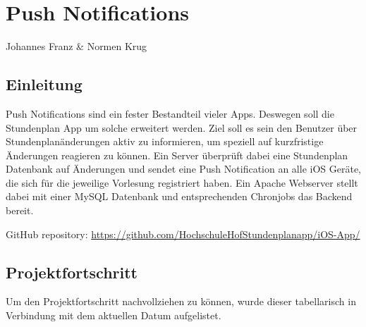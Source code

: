 \chapter{Push Notifications}
Johannes Franz \& Normen Krug

\section{Einleitung}
Push Notifications sind ein fester Bestandteil vieler Apps. Deswegen soll die Stundenplan App um solche erweitert werden. Ziel soll es sein den Benutzer über Stundenplanänderungen aktiv zu informieren, um speziell auf kurzfristige Änderungen reagieren zu können. Ein Server überprüft dabei eine Stundenplan Datenbank auf Änderungen und sendet eine Push Notification an alle iOS Geräte, die sich für die jeweilige Vorlesung registriert haben. Ein Apache Webserver stellt dabei mit einer MySQL Datenbank und entsprechenden Chronjobs das Backend bereit.

GitHub repository: \url{https://github.com/HochschuleHofStundenplanapp/iOS-App/}


\section{Projektfortschritt}
Um den Projektfortschritt nachvollziehen zu können, wurde dieser tabellarisch in Verbindung mit dem aktuellen Datum aufgelistet.


